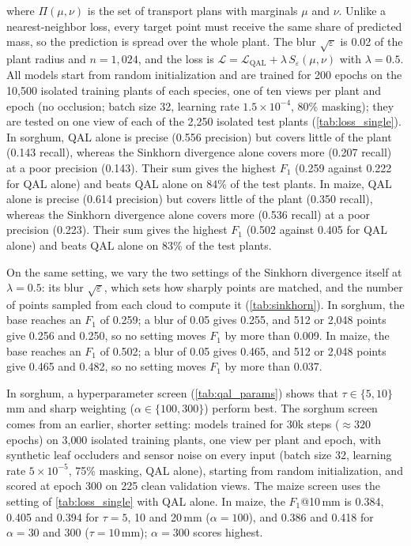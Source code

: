 \documentclass[10pt,twocolumn,letterpaper]{article}
\begin{document}
where $\Pi(\mu,\nu)$ is the set of transport plans with marginals $\mu$ and $\nu$. Unlike a nearest-neighbor loss, every
target point must receive the same share of predicted mass, so the prediction is spread over the whole plant. The blur
$\sqrt{\varepsilon}$ is 0.02 of the plant radius and $n = 1{,}024$, and the loss is
$\mathcal{L} = \mathcal{L}_{\mathrm{QAL}} + \lambda\,S_\varepsilon(\mu,\nu)$ with $\lambda = 0.5$. All models start from random
initialization and are trained for 200 epochs on the 10{,}500 isolated training plants of each species, one of ten views
per plant and epoch (no occlusion; batch size 32, learning rate $1.5\times10^{-4}$, 80\% masking); they are tested on one
view of each of the 2{,}250 isolated test plants (\cref{tab:loss_single}). In sorghum, QAL alone is precise (0.556 precision) but covers little of the plant (0.143 recall), whereas the Sinkhorn divergence alone covers more (0.207 recall) at a poor precision (0.143). Their sum gives the highest $F_1$ (0.259 against 0.222 for QAL alone) and beats QAL alone on 84\% of the test plants. In maize, QAL alone is precise (0.614 precision) but covers little of the plant (0.350 recall), whereas the Sinkhorn divergence alone covers more (0.536 recall) at a poor precision (0.223). Their sum gives the highest $F_1$ (0.502 against 0.405 for QAL alone) and beats QAL alone on 83\% of the test plants.

On the same setting, we vary the two settings of the Sinkhorn divergence itself at $\lambda = 0.5$: its blur
$\sqrt{\varepsilon}$, which sets how sharply points are matched, and the number of points sampled from each cloud to
compute it (\cref{tab:sinkhorn}).
In sorghum, the base reaches an $F_1$ of 0.259; a blur of 0.05 gives 0.255, and 512 or 2{,}048 points give 0.256 and 0.250, so no setting moves $F_1$ by more than 0.009. In maize, the base reaches an $F_1$ of 0.502; a blur of 0.05 gives 0.465, and 512 or 2{,}048 points give 0.465 and 0.482, so no setting moves $F_1$ by more than 0.037.

In sorghum, a hyperparameter screen (\cref{tab:qal_params}) shows that $\tau \in \{5, 10\}$\,mm and sharp
weighting ($\alpha \in \{100, 300\}$) perform best. The sorghum screen comes from an earlier, shorter setting: models trained for 30k steps
(${\approx}320$ epochs) on 3{,}000 isolated training plants, one view per plant and epoch, with synthetic leaf occluders
and sensor noise on every input (batch size 32, learning rate $5\times10^{-5}$, 75\% masking, QAL alone), starting from
random initialization, and scored at epoch 300 on 225 clean validation views. The maize screen uses the setting of \cref{tab:loss_single} with QAL alone. In maize, the $F_1$@10\,mm is 0.384, 0.405 and 0.394 for $\tau = 5$, 10 and 20\,mm ($\alpha=100$), and 0.386 and 0.418 for $\alpha = 30$ and 300 ($\tau=10$\,mm); $\alpha=300$ scores highest.
\end{document}
